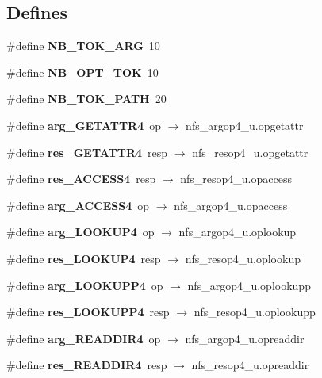 \subsection*{Defines}
\begin{CompactItemize}
\item 
\#define {\bf NB\_\-TOK\_\-ARG}\ 10
\item 
\#define {\bf NB\_\-OPT\_\-TOK}\ 10
\item 
\#define {\bf NB\_\-TOK\_\-PATH}\ 20
\item 
\#define {\bf arg\_\-GETATTR4}\ op $\rightarrow$ nfs\_\-argop4\_\-u.opgetattr
\item 
\#define {\bf res\_\-GETATTR4}\ resp $\rightarrow$ nfs\_\-resop4\_\-u.opgetattr
\item 
\#define {\bf res\_\-ACCESS4}\ resp $\rightarrow$ nfs\_\-resop4\_\-u.opaccess
\item 
\#define {\bf arg\_\-ACCESS4}\ op $\rightarrow$ nfs\_\-argop4\_\-u.opaccess
\item 
\#define {\bf arg\_\-LOOKUP4}\ op $\rightarrow$ nfs\_\-argop4\_\-u.oplookup
\item 
\#define {\bf res\_\-LOOKUP4}\ resp $\rightarrow$ nfs\_\-resop4\_\-u.oplookup
\item 
\#define {\bf arg\_\-LOOKUPP4}\ op $\rightarrow$ nfs\_\-argop4\_\-u.oplookupp
\item 
\#define {\bf res\_\-LOOKUPP4}\ resp $\rightarrow$ nfs\_\-resop4\_\-u.oplookupp
\item 
\#define {\bf arg\_\-READDIR4}\ op $\rightarrow$ nfs\_\-argop4\_\-u.opreaddir
\item 
\#define {\bf res\_\-READDIR4}\ resp $\rightarrow$ nfs\_\-resop4\_\-u.opreaddir
\end{CompactItemize}
